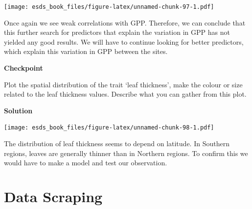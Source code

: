 \documentclass[
]{book}
\newenvironment{Shaded}{\begin{snugshade}}{\end{snugshade}}
\newcommand{\DataTypeTok}[1]{\textcolor[rgb]{0.13,0.29,0.53}{#1}}
\newcommand{\DecValTok}[1]{\textcolor[rgb]{0.00,0.00,0.81}{#1}}
\newcommand{\KeywordTok}[1]{\textcolor[rgb]{0.13,0.29,0.53}{\textbf{#1}}}
\newcommand{\NormalTok}[1]{#1}
\newcommand{\OperatorTok}[1]{\textcolor[rgb]{0.81,0.36,0.00}{\textbf{#1}}}
\newcommand{\StringTok}[1]{\textcolor[rgb]{0.31,0.60,0.02}{#1}}
\begin{document}
\texttt{[image: esds\_book\_files/figure-latex/unnamed-chunk-97-1.pdf]}

Once again we see weak correlations with GPP. Therefore, we can conclude that this further search for predictors that explain the variation in GPP has not yielded any good results. We will have to continue looking for better predictors, which explain this variation in GPP between the sites.

\textbf{Checkpoint}

Plot the spatial distribution of the trait `leaf thickness', make the colour or size related to the leaf thickness values. Describe what you can gather from this plot.

\textbf{Solution}

\begin{Shaded}
\end{Shaded}

\texttt{[image: esds\_book\_files/figure-latex/unnamed-chunk-98-1.pdf]}

The distribution of leaf thickness seems to depend on latitude. In Southern regions, leaves are generally thinner than in Northern regions. To confirm this we would have to make a model and test our observation.

\hypertarget{data-scraping}{%
\chapter{Data Scraping}\label{data-scraping}}
\end{document}
